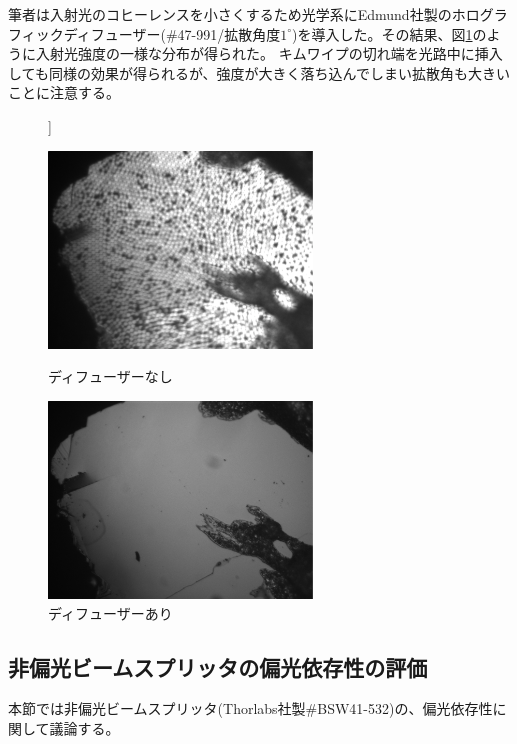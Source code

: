 \documentclass[11pt,a4paper]{jsarticle}
\begin{document}
筆者は入射光のコヒーレンスを小さくするため光学系にEdmund社製のホログラフィックディフューザー(\#47-991/拡散角度$1^\circ$)を導入した。その結果、図\ref{fig:with_diffuser}のように入射光強度の一様な分布が得られた。
キムワイプの切れ端を光路中に挿入しても同様の効果が得られるが、強度が大きく落ち込んでしまい拡散角も大きいことに注意する。
\begin{figure}[htb]]
 \begin{minipage}{0.5\hsize}
  \begin{center}
   \includegraphics[width=70mm]{without_diffuser.eps}
  \end{center}
  \caption{ディフューザーなし}
  \label{fig:without_diffuser}
 \end{minipage}
 \begin{minipage}{0.5\hsize}
  \begin{center}
   \includegraphics[width=70mm]{with_diffuser.eps}
  \end{center}
  \caption{ディフューザーあり}
  \label{fig:with_diffuser}
 \end{minipage}
\end{figure}

\subsection{非偏光ビームスプリッタの偏光依存性の評価}
\label{seq:BS_characterization}
本節では非偏光ビームスプリッタ(Thorlabs社製\#BSW41-532)の、偏光依存性に関して議論する。
\end{document}
